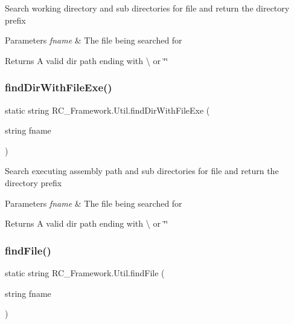 Search working directory and sub directories for file and return the directory prefix 


\begin{DoxyParams}{Parameters}
{\em fname} & The file being searched for\\
\hline
\end{DoxyParams}
\begin{DoxyReturn}{Returns}
A valid dir path ending with \textbackslash{} or \char`\"{}\char`\"{} 
\end{DoxyReturn}
\mbox{\label{class_r_c___framework_1_1_util_a3cb2180e25fa07003655a8f93d0d3d85}} 
\subsubsection{\texorpdfstring{find\+Dir\+With\+File\+Exe()}{findDirWithFileExe()}}
{\footnotesize\ttfamily static string R\+C\+\_\+\+Framework.\+Util.\+find\+Dir\+With\+File\+Exe (\begin{DoxyParamCaption}\item[{string}]{fname }\end{DoxyParamCaption})\hspace{0.3cm}{\ttfamily [static]}}



Search executing assembly path and sub directories for file and return the directory prefix 


\begin{DoxyParams}{Parameters}
{\em fname} & The file being searched for\\
\hline
\end{DoxyParams}
\begin{DoxyReturn}{Returns}
A valid dir path ending with \textbackslash{} or \char`\"{}\char`\"{} 
\end{DoxyReturn}
\mbox{\label{class_r_c___framework_1_1_util_a85009919b261b85302abf6f7bd1d02ce}} 
\subsubsection{\texorpdfstring{find\+File()}{findFile()}}
{\footnotesize\ttfamily static string R\+C\+\_\+\+Framework.\+Util.\+find\+File (\begin{DoxyParamCaption}\item[{string}]{fname }\end{DoxyParamCaption})\hspace{0.3cm}{\ttfamily [static]}}



